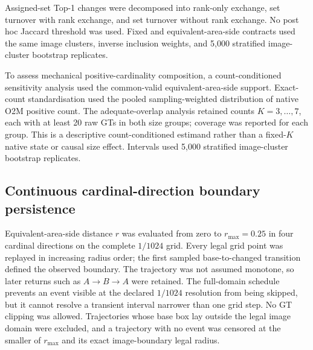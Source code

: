 Assigned-set Top-1 changes were decomposed into rank-only exchange, set turnover with rank exchange, and set turnover without rank exchange. No post hoc Jaccard threshold was used. Fixed and equivalent-area-side contracts used the same image clusters, inverse inclusion weights, and 5,000 stratified image-cluster bootstrap replicates.

To assess mechanical positive-cardinality composition, a count-conditioned sensitivity analysis used the common-valid equivalent-area-side support. Exact-count standardisation used the pooled sampling-weighted distribution of native O2M positive count. The adequate-overlap analysis retained counts $K=3,\ldots,7$, each with at least 20 raw GTs in both size groups; coverage was reported for each group. This is a descriptive count-conditioned estimand rather than a fixed-$K$ native state or causal size effect. Intervals used 5,000 stratified image-cluster bootstrap replicates.

\subsection{Continuous cardinal-direction boundary persistence}

Equivalent-area-side distance $r$ was evaluated from zero to $r_{\max}=0.25$ in four cardinal directions on the complete $1/1024$ grid. Every legal grid point was replayed in increasing radius order; the first sampled base-to-changed transition defined the observed boundary. The trajectory was not assumed monotone, so later returns such as $A\rightarrow B\rightarrow A$ were retained. The full-domain schedule prevents an event visible at the declared $1/1024$ resolution from being skipped, but it cannot resolve a transient interval narrower than one grid step. No GT clipping was allowed. Trajectories whose base box lay outside the legal image domain were excluded, and a trajectory with no event was censored at the smaller of $r_{\max}$ and its exact image-boundary legal radius.


